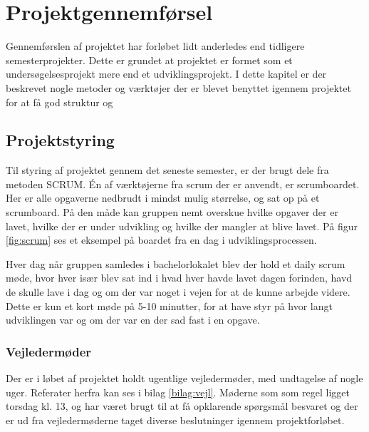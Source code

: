 \thispagestyle{fancy}
\chapter{Projektgennemførsel}
\label{chp:projektgennemforsel}

Gennemførslen af projektet har forløbet lidt anderledes end tidligere semesterprojekter. Dette er grundet at projektet er formet som et undersøgelsesprojekt mere end et udviklingsprojekt. I dette kapitel er der beskrevet nogle metoder og værktøjer der er blevet benyttet igennem projektet for at få god struktur og

\section{Projektstyring}
\label{sec:projektstyring}

Til styring af projektet gennem det seneste semester, er der brugt dele fra metoden SCRUM.
Én af værktøjerne fra scrum der er anvendt, er scrumboardet. Her er alle opgaverne nedbrudt i mindst mulig størrelse, og sat op på et scrumboard. På den måde kan gruppen nemt overskue hvilke opgaver der er lavet, hvilke der er under udvikling og hvilke der mangler at blive lavet. På figur \ref{fig:scrum} ses et eksempel på boardet fra en dag i udviklingsprocessen. 


Hver dag når gruppen samledes i bachelorlokalet blev der hold et daily scrum møde, hvor hver især blev sat ind i hvad hver havde lavet dagen forinden, havd de skulle lave i dag og om der var noget i vejen for at de kunne arbejde videre. Dette er kun et kort møde på 5-10 minutter, for at have styr på hvor langt udviklingen var og om der var en der sad fast i en opgave.

\subsection{Vejledermøder}
Der er i løbet af projektet holdt ugentlige vejledermøder, med undtagelse af nogle uger. Referater herfra kan ses i bilag \ref{bilag:vejl}. Møderne som som regel ligget torsdag kl. 13, og har været brugt til at få opklarende spørgsmål besvaret og der er ud fra vejledermøderne taget diverse beslutninger igennem projektforløbet.

